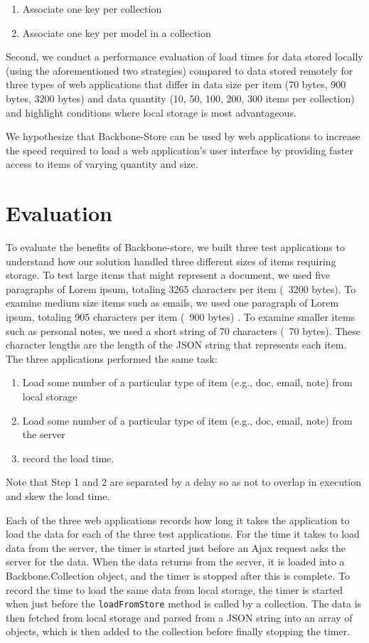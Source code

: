 \documentclass[12pt]{article}
\begin{document}
\begin{enumerate}
\item Associate one key per collection
\item Associate one key per model in a collection
\end{enumerate}

Second, we conduct a performance evaluation of load times for data
stored locally (using the aforementioned two strategies) compared to data
stored remotely for three types of web applications that differ in data size
per item (70 bytes, 900 bytes, 3200 bytes) and data quantity (10, 50, 100, 200,
300 items per collection) and highlight conditions where local storage is most
advantageous.

We hypothesize that Backbone-Store can be used by web applications to increase the speed required to load a web application's user interface by providing faster access to items of varying quantity and size.

\section{Evaluation}

To evaluate the benefits of Backbone-store, we built three test applications to
understand how our solution handled three different sizes of items requiring
storage. To test large items that might represent a document, we used five
paragraphs of Lorem ipsum, totaling 3265 characters per item (~3200 bytes). To examine
medium size items such as emails, we used one paragraph of Lorem ipsum,
totaling 905 characters per item (~900 bytes) . To examine smaller items such as personal
notes, we used a short string of 70 characters (~70 bytes). These character lengths are the
length of the JSON string that represents each item. The three applications
performed the same task: 
\begin{enumerate}
\item Load some number of a particular type of item (e.g., doc, email, note) from
local storage
\item Load some number of a particular type of item (e.g., doc, email, note) from the server
\item record the load time.
\end{enumerate}

Note that Step 1 and 2 are separated by a delay so as not to overlap in
execution and skew the load time.

Each of the three web applications records how long it takes the application to
load the data for each of the three test applications. For the time it takes to
load data from the server, the timer is started just before an Ajax request
asks the server for the data. When the data returns from the server, it is
loaded into a Backbone.Collection object, and the timer is stopped after this
is complete. To record the time to load the same data from local storage, the
timer is started when just before the \verb=loadFromStore= method is called by
a collection. The data is then fetched from local storage and parsed from a JSON
string into an array of objects, which is then added to the collection before
finally stopping the timer.
\end{document}
